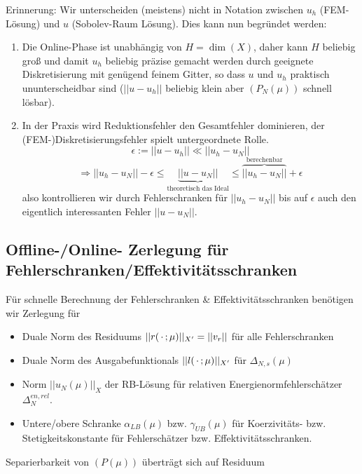 \begin{bem}
	Erinnerung: Wir unterscheiden (meistens) nicht in Notation zwischen $u_h$ (FEM-Lösung) und $u$ (Sobolev-Raum Lösung). Dies kann nun begründet werden:
	\begin{enumerate}
		\item Die Online-Phase ist unabhängig von $H = \dim(X)$, daher kann $H$ beliebig groß und damit $u_h$ beliebig präzise gemacht werden durch geeignete Diskretisierung mit genügend feinem Gitter, so dass $u$ und $u_h$ praktisch ununterscheidbar sind ($||u - u_h ||$ beliebig klein aber $(P_N(\mu))$ schnell lösbar).
		\item In der Praxis wird Reduktionsfehler den Gesamtfehler dominieren, der (FEM-)Diskretisierungsfehler spielt untergeordnete Rolle.
		\[
			\epsilon := ||u - u_h|| \ll ||u_h - u_N||
		\]
		\[
			\Rightarrow ||u_h - u_N|| - \epsilon \leq \underbrace{||u-u_N||}_{\text{theoretisch das Ideal}} \leq \overbrace{||u_h - u_N||}^{\text{berechenbar}} + \epsilon
		\]
		also kontrollieren wir durch Fehlerschranken für $||u_h - u_N||$ bis auf $\epsilon$ auch den eigentlich interessanten Fehler $||u - u_N||$.
	\end{enumerate}
\end{bem}

\subsection{Offline-/Online- Zerlegung für Fehlerschranken/Effektivitätsschranken}

Für schnelle Berechnung der Fehlerschranken \& Effektivitätsschranken benötigen wir Zerlegung für
\begin{itemize}
	\item Duale Norm des Residuums $|| r(\,\cdot\, ; \mu)||_{X'} = ||v_r||$ für alle Fehlerschranken
	\item Duale Norm des Ausgabefunktionals $|| l(\,\cdot\,;\mu)||_{X'}$ für $\Delta_{N,s}(\mu)$
	\item Norm $||u_N (\mu) ||_X$ der RB-Lösung für relativen Energienormfehlerschätzer $\Delta_N^{en, rel}$.
	\item Untere/obere Schranke $\alpha_{LB}(\mu)$ bzw. $\gamma_{UB} (\mu)$ für Koerzivitäts- bzw. Stetigkeitskonstante für Fehlerschätzer bzw. Effektivitätsschranken.
\end{itemize}
Separierbarkeit von $(P(\mu))$ überträgt sich auf Residuum

